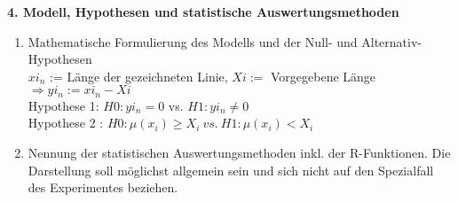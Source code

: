 \documentclass[ ngerman, fontsize= 12pt, paper=a4, headings=big, titlepage=true]{article}
\begin{document}
\textbf{4. Modell, Hypothesen und statistische Auswertungsmethoden}
\begin{enumerate}[-]
	\item  Mathematische Formulierung des Modells und der Null- und Alternativ-Hypothesen \\
		$xi_n$ := Länge  der gezeichneten Linie, $Xi:=$ Vorgegebene Länge $\Rightarrow yi_n := xi_n-Xi$ \\
		Hypothese 1: $H0: yi_n =0 $  vs. $ H1: yi_n \neq 0$ \\
		Hypothese 2 : $H0:\mu(x_i) \geq X_i \  vs. \ H1:  \mu(x_i) < X_i$
	\item Nennung der statistischen Auswertungsmethoden inkl. der R-Funktionen. Die Darstellung soll möglichst allgemein sein und sich nicht auf den Spezialfall des Experimentes
	beziehen.
\end{enumerate}
\end{document}

